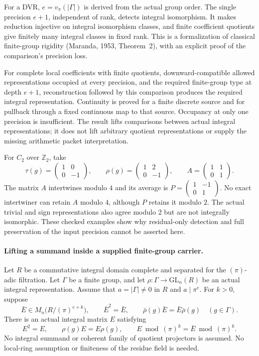 \documentclass[11pt]{article}
\theoremstyle{definition}
\theoremstyle{remark}
\begin{document}
For a DVR, $e=v_\pi(|\Gamma|)$ is derived from the actual group order.
The single precision $e+1$, independent of rank, detects integral
isomorphism. It makes reduction injective on integral isomorphism classes,
and finite coefficient quotients give finitely many integral classes in
fixed rank. This is a formalization of classical finite-group rigidity
(Maranda, 1953, Theorem~2), with an explicit proof of the comparison's
precision loss.

For complete local coefficients with finite quotients, downward-compatible
allowed representations occupied at every precision, and the required
finite-group type at depth $e+1$, reconstruction followed by this comparison
produces the required integral representation. Continuity is proved for a
finite discrete source and for pullback through a fixed continuous map to
that source. Occupancy at only one precision is insufficient. The result
lifts comparisons between actual integral representations; it does not lift
arbitrary quotient representations or supply the missing arithmetic packet
interpretation.

For $C_2$ over $\mathbb Z_2$, take
\[
\tau(g)=\begin{pmatrix}1&0\\0&-1\end{pmatrix},\qquad
\rho(g)=\begin{pmatrix}1&2\\0&-1\end{pmatrix},\qquad
A=\begin{pmatrix}1&1\\0&1\end{pmatrix}.
\]
The matrix $A$ intertwines modulo $4$ and its average is
$P=\left(\begin{smallmatrix}1&-1\\0&1\end{smallmatrix}\right)$.
No exact intertwiner can retain $A$ modulo $4$, although $P$ retains it
modulo $2$. The actual trivial and sign representations also agree modulo
$2$ but are not integrally isomorphic. These checked examples show why
residual-only detection and full preservation of the input precision cannot
be asserted here.


\paragraph{Lifting a summand inside a supplied finite-group carrier.}\label{book:x-construction-18}
Let $R$ be a commutative integral domain complete and separated for the
$(\pi)$-adic filtration. Let $\Gamma$ be a finite group, and let
$\rho:\Gamma\to\mathrm{GL}_n(R)$ be an actual integral representation.
Assume that $a=|\Gamma|\ne0$ in $R$ and $a\mid\pi^e$. For $k>0$, suppose
\[
\bar E\in M_n\bigl(R/(\pi)^{e+k}\bigr),\qquad
\bar E^2=\bar E,\qquad
\bar\rho(g)\bar E=\bar E\bar\rho(g)\quad(g\in\Gamma).
\]
There is an actual integral matrix $E$ satisfying
\[
E^2=E,\qquad \rho(g)E=E\rho(g),\qquad
E\bmod(\pi)^k=\bar E\bmod(\pi)^k.
\]
No integral summand or coherent family of quotient projectors is assumed.
No local-ring assumption or finiteness of the residue field is needed.
\end{document}

